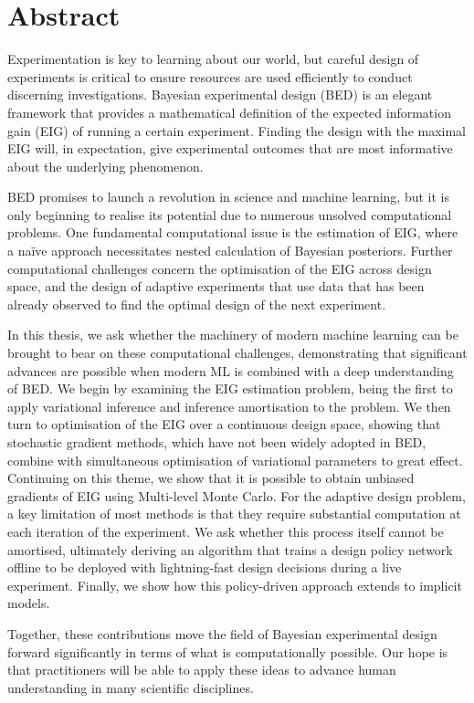 \documentclass[a4paper, 10pt]{report}
\theoremstyle{plain}
\begin{document}
	
	
	
	\newpage
	\chapter*{Abstract}
	Experimentation is key to learning about our world, but careful design of experiments is critical to ensure resources are used efficiently to conduct discerning investigations. Bayesian experimental design (BED) is an elegant framework that provides a mathematical definition of the expected information gain (EIG) of running a certain experiment. Finding the design with the maximal EIG will, in expectation, give experimental outcomes that are most informative about the underlying phenomenon.
	
	BED promises to launch a revolution in science and machine learning, but it is only beginning to realise its potential due to numerous unsolved computational problems. One fundamental computational issue is the estimation of EIG, where a naïve approach necessitates nested calculation of Bayesian posteriors. Further computational challenges concern the optimisation of the EIG across design space, and the design of adaptive experiments that use data that has been already observed to find the optimal design of the next experiment.
	
	In this thesis, we ask whether the machinery of modern machine learning can be brought to bear on these computational challenges, demonstrating that significant advances are possible when modern ML is combined with a deep understanding of BED. We begin by examining the EIG estimation problem, being the first to apply variational inference and inference amortisation to the problem. We then turn to optimisation of the EIG over a continuous design space, showing that stochastic gradient methods, which have not been widely adopted in BED, combine with simultaneous optimisation of variational parameters to great effect. Continuing on this theme, we show that it is possible to obtain unbiased gradients of EIG using Multi-level Monte Carlo. For the adaptive design problem, a key limitation of most methods is that they require substantial computation at each iteration of the experiment. We ask whether this process itself cannot be amortised, ultimately deriving an algorithm that trains a design policy network offline to be deployed with lightning-fast design decisions during a live experiment. Finally, we show how this policy-driven approach extends to implicit models.
	
	Together, these contributions move the field of Bayesian experimental design forward significantly in terms of what is computationally possible. Our hope is that practitioners will be able to apply these ideas to advance human understanding in many scientific disciplines.
	
\end{document}
